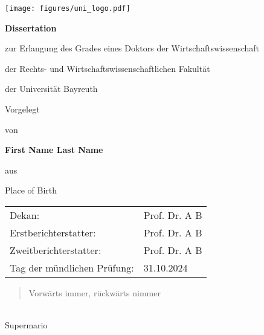 \begin{titlepage}
  \centering
  \normalsize
  
  \texttt{[image: figures/uni\_logo.pdf]}  
  
  \vspace{3cm}
  
  \Large{\bfseries \disstitle} \par
      
  \vspace{4cm}
      
  \large{\textbf{Dissertation}} \par
  \large{zur Erlangung des Grades eines Doktors der Wirtschaftswissenschaft} \par
  \large{der Rechts- und Wirtschaftswissenschaftlichen Fakultät} \par
  \large{der Universität Bayreuth}\par
  
  
  \vfill
      
  \large{Vorgelegt} \par
  \large{von} \par
  \large{\textbf{First Name Last Name}} \par
  \large{aus} \par
  \large{Place of Birth}\par
  \end{titlepage}
      
      
  \newpage
      
  \thispagestyle{empty}
      
  \mbox{}
      
  \vfill    
  \begin{table*}[h]
  \begin{tabular} {p{8cm} l} 
  Dekan:                          & Prof. Dr. A B \\
  Erstberichterstatter:           & Prof. Dr. A B \\
  Zweitberichterstatter:          & Prof. Dr. A B \\
  Tag der mündlichen Prüfung:     & 31.10.2024 \\
  \end{tabular}
  \end{table*}
    
  \clearpage
    
  \thispagestyle{empty}
  \begin{center}
      \vspace*{\fill}
      {\Large\blockquote{Vorwärts immer, rückwärts nimmer}} \\
      \vspace{0.5cm}
      {Supermario}
  \vspace*{\fill}
  \end{center}
  
  \clearpage	